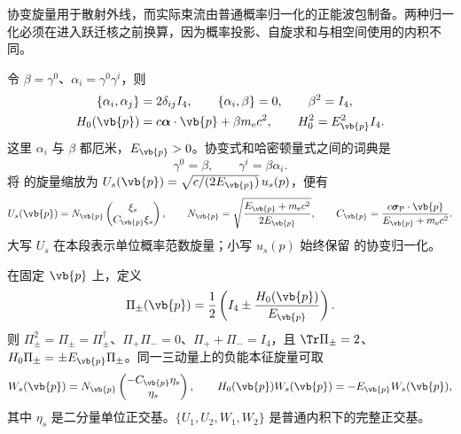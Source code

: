 协变旋量用于散射外线，而实际束流由普通概率归一化的正能波包制备。两种归一化必须在进入跃迁核之前换算，因为概率投影、自旋求和与相空间使用的内积不同。

\begin{definition}[自由哈密顿量与概率归一化旋量]
令 $\beta=\gamma^0$、$\alpha_i=\gamma^0\gamma^i$，则
\begin{align}
 \{\alpha_i,\alpha_j\}&=2\delta_{ij}I_4,\qquad
 \{\alpha_i,\beta\}=0,\qquad \beta^2=I_4,
 \label{eq:feqo-dirac-anticommutators}\\
 H_0(\vb{p})&=c\boldsymbol\alpha\cdot\vb{p}+\beta m_{\mathrm e}c^2,
 \qquad H_0^2=E_{\vb{p}}^2I_4.
 \label{eq:feqo-dirac-free}
\end{align}
这里 $\alpha_i$ 与 $\beta$ 都厄米，$E_{\vb{p}}>0$。协变式和哈密顿量式之间的词典是
\begin{equation}
 \gamma^0=\beta,\qquad \gamma^i=\beta\alpha_i.
 \label{eq:feqo-gamma-dictionary}
\end{equation}
将 的旋量缩放为 $U_s(\vb{p})=\sqrt{c/(2E_{\vb{p}})}\,u_s(p)$，便有
\begin{equation}
 U_s(\vb{p})=N_{\vb{p}}
 \begin{pmatrix}\xi_s\\ C_{\vb{p}}\xi_s\end{pmatrix},
 \qquad
 N_{\vb{p}}=\sqrt{\frac{E_{\vb{p}}+m_{\mathrm e}c^2}{2E_{\vb{p}}}},
 \qquad
 C_{\vb{p}}=\frac{c\boldsymbol\sigma_{\rm P}\cdot\vb{p}}
 {E_{\vb{p}}+m_{\mathrm e}c^2}.
 \label{eq:feqo-positive-spinor}
\end{equation}
大写 $U_s$ 在本段表示单位概率范数旋量；小写 $u_s(p)$ 始终保留 的协变归一化。
\end{definition}

\begin{proposition}[同一动量上的正交能量分解]
在固定 $\vb{p}$ 上，定义
\begin{equation}
 \Pi_\pm(\vb{p})=\frac12\left(I_4\pm\frac{H_0(\vb{p})}{E_{\vb{p}}}\right).
 \label{eq:feqo-hamiltonian-energy-projectors}
\end{equation}
则 $\Pi_\pm^2=\Pi_\pm=\Pi_\pm^\dagger$、$\Pi_+\Pi_-=0$、$\Pi_++\Pi_-=I_4$，且 $\Tr\Pi_\pm=2$、$H_0\Pi_\pm=\pm E_{\vb{p}}\Pi_\pm$。同一三动量上的负能本征旋量可取
\begin{equation}
 W_s(\vb{p})=N_{\vb{p}}
 \begin{pmatrix}-C_{\vb{p}}\eta_s\\\eta_s\end{pmatrix},
 \qquad H_0(\vb{p})W_s(\vb{p})=-E_{\vb{p}}W_s(\vb{p}),
 \label{eq:feqo-negative-hamiltonian-spinor}
\end{equation}
其中 $\eta_s$ 是二分量单位正交基。$\{U_1,U_2,W_1,W_2\}$ 是普通内积下的完整正交基。
\end{proposition}

